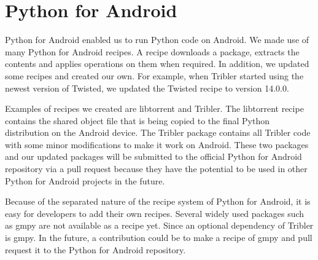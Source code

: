 \section{Python for Android}
\label{sec:pythonforandroid}
	Python for Android enabled us to run Python code on Android. We made use of many Python for Android recipes. A recipe downloads a package, extracts the contents and applies operations on them when required. In addition, we updated some recipes and created our own. For example, when Tribler started using the newest version of Twisted, we updated the Twisted recipe to version 14.0.0.
	
	Examples of recipes we created are libtorrent and Tribler. The libtorrent recipe contains the shared object file that is being copied to the final Python distribution on the Android device. The Tribler package contains all Tribler code with some minor modifications to make it work on Android. These two packages and our updated packages will be submitted to the official Python for Android repository via a pull request because they have the potential to be used in other Python for Android projects in the future.
	
	Because of the separated nature of the recipe system of Python for Android, it is easy for developers to add their own recipes. Several widely used packages such as gmpy are not available as a recipe yet. Since an optional dependency of Tribler is gmpy. In the future, a contribution could be to make a recipe of gmpy and pull request it to the Python for Android repository.